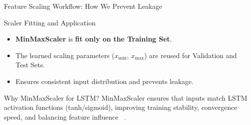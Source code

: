 \begin{frame}[label=featurescalingworkflow]{Feature Scaling Workflow: How We Prevent Leakage}

\small

\begin{block}{Scaler Fitting and Application}
\begin{itemize}
    \item \textbf{MinMaxScaler} is \textbf{fit only on the Training Set}.
    \item The learned scaling parameters ($x_{\min}$, $x_{\max}$) are reused for Validation and Test Sets.
    \item Ensures consistent input distribution and prevents leakage.
\end{itemize}
\end{block}

\begin{alertblock}{Why MinMaxScaler for LSTM?}
MinMaxScaler ensures that inputs match LSTM activation functions (tanh/sigmoid), improving training stability, convergence speed, and balancing feature influence
~\parencite{shaban2024SMPDL,phuoc2024StockPrediction}.
\end{alertblock}

\end{frame}



